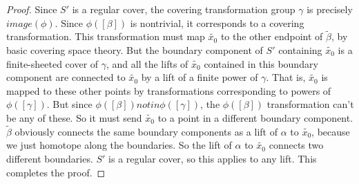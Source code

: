 \begin{proof}
Since $S'$ is a regular cover, the covering transformation group $\gamma$ is
precisely $image(\phi)$. Since $\phi([\beta])$ is nontrivial, it corresponds to
a covering transformation. This transformation must map $\widetilde{x_0}$ to
the other endpoint of $\widetilde{\beta}$, by basic covering space theory. But the
boundary component of $S'$ containing $\widetilde{x_0}$ is a finite-sheeted
cover of $\gamma$, and all the lifts of $\widetilde{x_0}$ contained in this
boundary component are connected to $\widetilde{x_0}$ by a lift of a finite
power of $\gamma$. That is, $\widetilde{x_0}$ is mapped to these other points
by transformations corresponding to powers of $\phi([\gamma])$.  But since
$\phi([\beta]) notin \phi([\gamma])$, the $\phi([\beta])$ transformation can't
be any of these. So it must send $\widetilde{x_0}$ to a point in a different
boundary component. $\widetilde{\beta}$ obviously connects the same boundary
components as a lift of $\alpha$ to $\widetilde{x_0}$, because we just homotope
along the boundaries. So the lift of $\alpha$ to $\widetilde{x_0}$ connects two
different boundaries.  $S'$ is a regular cover, so this applies to any lift.
This completes the proof.

\end{proof}

